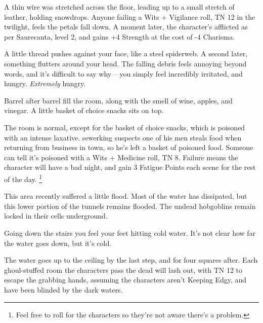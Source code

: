 \begin{multicols}{2}
A thin wire was stretched across the floor, leading up to a small stretch of leather, holding snowdrops.  Anyone failing a Wits + Vigilance roll, TN 12 in the twilight, feels the petals fall down.  A moment later, the character's afflicted as per Saurecanta, level 2, and gains +4 Strength at the cost of -4 Charisma.

\begin{boxtext}

  A little thread pushes against your face, like a steel spiderweb.
  A second later, something flutters around your head.
  The falling debris feels annoying beyond words, and it's difficult to say why -- you simply feel incredibly irritated, and hungry.
  \emph{Extremely} hungry.

\end{boxtext}

\label{sewerFood}

\begin{boxtext}

  Barrel after barrel fill the room, along with the smell of wine, apples, and vinegar.  A little basket of choice snacks sits on top.

\end{boxtext}

The room is normal, except for the basket of choice snacks, which is poisoned with an intense laxative.
\Gls{sewerking} suspects one of his men steals food when returning from business in \gls{town}, so he's left a basket of poisoned food.
Someone can tell it's poisoned with a Wits + Medicine roll, TN 8.
Failure means the character will have a bad night, and gain 3 Fatigue Points each scene for the rest of the day.%
\footnote{Feel free to roll for the characters so they're not aware there's a problem.}

\label{sewerWaterHall}

This area recently suffered a little flood.  Most of the water has dissipated, but this lower portion of the tunnels remains flooded.  The undead hobgoblins remain locked in their cells underground.


\begin{boxtext}
  Going down the stairs you feel your feet hitting cold water.  It's not clear how far the water goes down, but it's cold.
\end{boxtext}

The water goes up to the ceiling by the last step, and for four squares after.  Each ghoul-stuffed room the characters pass the dead will lash out, with TN 12 to escape the grabbing hands, assuming the characters aren't Keeping Edgy, and have been blinded by the dark waters.


\end{multicols}
